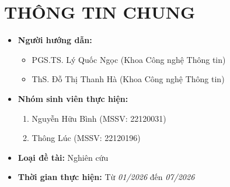 \documentclass{article}[14pt]
\begin{document}
    \section{THÔNG TIN CHUNG}
    \begin{itemize}[label = {}]
        
        \item \textbf{Người hướng dẫn:} 
        \begin{itemize}
            \item PGS.TS. Lý Quốc Ngọc (Khoa Công nghệ Thông tin)
            \item ThS. Đỗ Thị Thanh Hà (Khoa Công nghệ Thông tin)
        \end{itemize}{}
    
        
        \item \textbf{Nhóm sinh viên thực hiện:}
        
        \begin{enumerate}
        
            \item Nguyễn Hữu Bình (MSSV: 22120031) 
            \item Thông Lúc (MSSV: 22120196)
        \end{enumerate}

        \item \textbf{Loại đề tài:} Nghiên cứu
        
        \item \textbf{Thời gian thực hiện:} Từ \textit{01/2026} đến \textit{07/2026}
        
    \end{itemize}
    
    \pagebreak 
    
\end{document}
